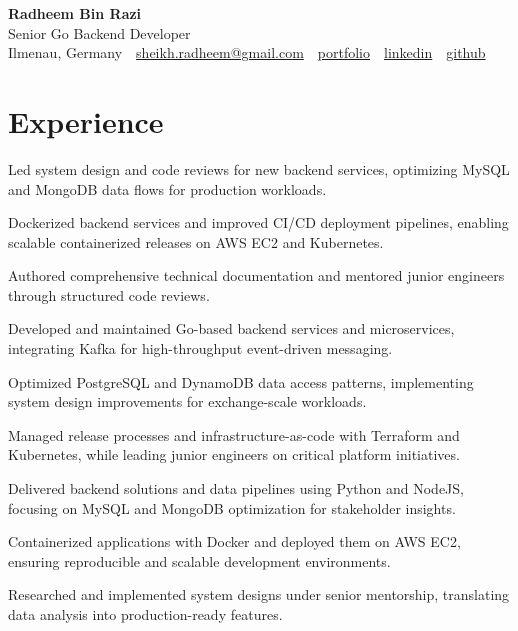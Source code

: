 \documentclass[11pt,a4paper]{resume}
\makeatletter
\newcommand{\Portfolio}{https://radheem.github.io/my-cv}
\newcommand{\PortfolioText}{portfolio}
\newcommand{\GitHub}{https://github.com/radheem}
\newcommand{\LinkedIn}{https://www.linkedin.com/in/radheem-razi}
\newcommand{\Email}{sheikh.radheem@gmail.com}
\makeatother
\begin{document}
\begin{center}
  {\huge\bfseries Radheem Bin Razi}\\[3pt]
  {\large Senior Go Backend Developer}\\[6pt]
  \small
  Ilmenau, Germany \,\textbar\,
  \href{mailto:\Email}{\Email} \,\textbar\,
  \href{\Portfolio}{\PortfolioText} \,\textbar\,
  \href{\LinkedIn}{linkedin} \,\textbar\,
  \href{\GitHub}{github}
\end{center}
\vspace{2pt}

\section{Experience}

\bullets
  \item Led system design and code reviews for new backend services, optimizing MySQL and MongoDB data flows for production workloads.
  \item Dockerized backend services and improved CI/CD deployment pipelines, enabling scalable containerized releases on AWS EC2 and Kubernetes.
  \item Authored comprehensive technical documentation and mentored junior engineers through structured code reviews.
\bulletsend
\vspace{3pt}
\bullets
  \item Developed and maintained Go-based backend services and microservices, integrating Kafka for high-throughput event-driven messaging.
  \item Optimized PostgreSQL and DynamoDB data access patterns, implementing system design improvements for exchange-scale workloads.
  \item Managed release processes and infrastructure-as-code with Terraform and Kubernetes, while leading junior engineers on critical platform initiatives.
\bulletsend
\vspace{3pt}
\bullets
  \item Delivered backend solutions and data pipelines using Python and NodeJS, focusing on MySQL and MongoDB optimization for stakeholder insights.
  \item Containerized applications with Docker and deployed them on AWS EC2, ensuring reproducible and scalable development environments.
  \item Researched and implemented system designs under senior mentorship, translating data analysis into production-ready features.
\bulletsend
\vspace{3pt}
\end{document}
